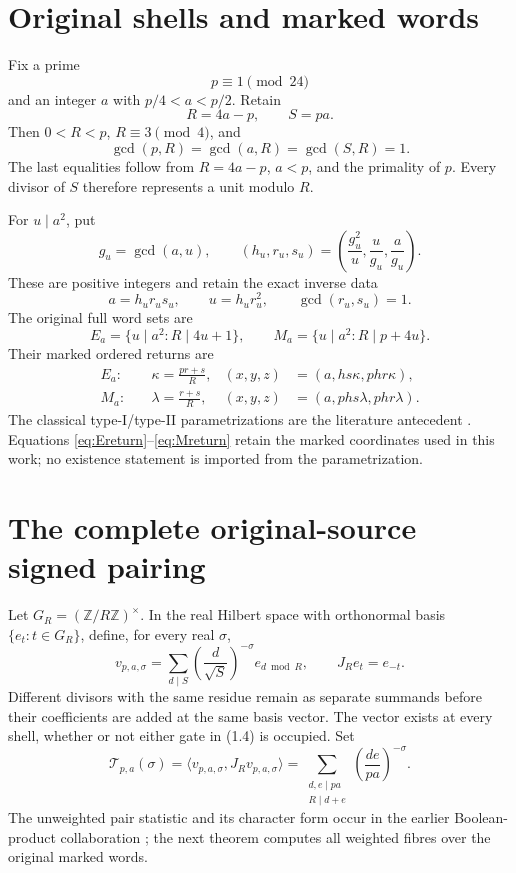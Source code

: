 \section{Original shells and marked words}

Fix a prime
\[
 p\equiv1\pmod{24}
\]
and an integer $a$ with $p/4<a<p/2$.  Retain
\[
 R=4a-p,\qquad S=pa.
\]
Then $0<R<p$, $R\equiv3\pmod4$, and
\[
 \gcd(p,R)=\gcd(a,R)=\gcd(S,R)=1.                 \tag{1.1}
\]
The last equalities follow from $R=4a-p$, $a<p$, and the primality of $p$.
Every divisor of $S$ therefore represents a unit modulo $R$.

For $u\mid a^2$, put
\[
 g_u=\gcd(a,u),\qquad
 (h_u,r_u,s_u)=
 \left(\frac{g_u^2}{u},\frac{u}{g_u},\frac{a}{g_u}\right).       \tag{1.2}
\]
These are positive integers and retain the exact inverse data
\[
 a=h_ur_us_u,\qquad u=h_ur_u^2,\qquad \gcd(r_u,s_u)=1.            \tag{1.3}
\]
The original full word sets are
\[
 E_a=\{u\mid a^2:R\mid4u+1\},\qquad
 M_a=\{u\mid a^2:R\mid p+4u\}.                                 \tag{1.4}
\]
Their marked ordered returns are
\begin{align}
 E_a:\quad&\kappa=\frac{pr+s}{R},&
 (x,y,z)&=(a,hs\kappa,phr\kappa),                               \tag{1.5}\label{eq:Ereturn}\\
 M_a:\quad&\lambda=\frac{r+s}{R},&
 (x,y,z)&=(a,phs\lambda,phr\lambda).                            \tag{1.6}\label{eq:Mreturn}
\end{align}
The classical type-I/type-II parametrizations are the literature antecedent
\citep[Section~2, Propositions~2.2 and~2.6]{ElsholtzTao}.  Equations
\eqref{eq:Ereturn}--\eqref{eq:Mreturn} retain the marked coordinates used in
this work; no existence statement is imported from the parametrization.

\section{The complete original-source signed pairing}

Let $G_R=(\mathbb Z/R\mathbb Z)^\times$.  In the real Hilbert space with
orthonormal basis $\{e_t:t\in G_R\}$, define, for every real $\sigma$,
\[
 v_{p,a,\sigma}
 =\sum_{d\mid S}\left(\frac d{\sqrt S}\right)^{-\sigma}e_{d\bmod R},
 \qquad J_Re_t=e_{-t}.                                          \tag{2.1}
\]
Different divisors with the same residue remain as separate summands before
their coefficients are added at the same basis vector.  The vector exists at
every shell, whether or not either gate in (1.4) is occupied.  Set
\[
 \mathcal T_{p,a}(\sigma)
 =\langle v_{p,a,\sigma},J_Rv_{p,a,\sigma}\rangle
 =\sum_{\substack{d,e\mid pa\\R\mid d+e}}
   \left(\frac{de}{pa}\right)^{-\sigma}.                         \tag{2.2}\label{eq:signedpair}
\]
The unweighted pair statistic and its character form occur in the earlier
Boolean-product collaboration \citep[BP15--BP16]{Boolean}; the next theorem
computes all weighted fibres over the original marked words.

